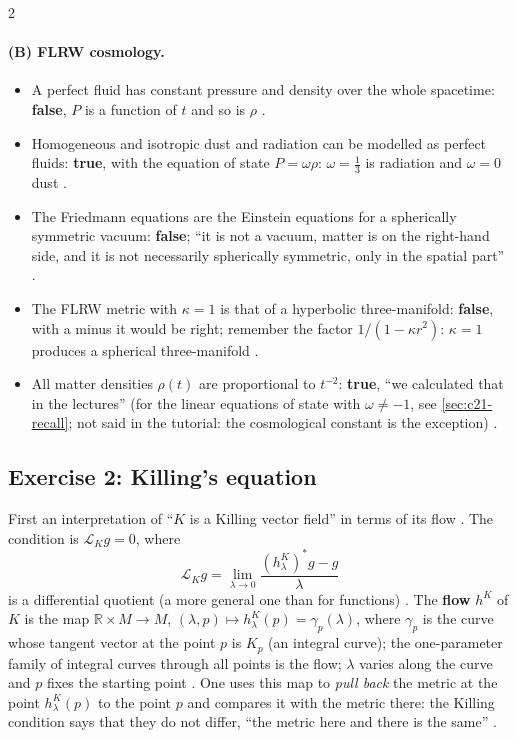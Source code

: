 \begin{paracol}{2}
\paragraph{(B) FLRW cosmology.}
\begin{itemize}
  \item A perfect fluid has constant pressure and density over the whole spacetime: \textbf{false}, $P$ is a function of $t$ and so is $\rho$ .
  \item Homogeneous and isotropic dust and radiation can be modelled as perfect fluids: \textbf{true}, with the equation of state $P=\omega\rho$: $\omega=\tfrac13$ is radiation and $\omega=0$ dust .
  \item The Friedmann equations are the Einstein equations for a spherically symmetric vacuum: \textbf{false}; ``it is not a vacuum, matter is on the right-hand side, and it is not necessarily spherically symmetric, only in the spatial part'' .
  \item The FLRW metric with $\kappa=1$ is that of a hyperbolic three-manifold: \textbf{false}, with a minus it would be right; remember the factor $1/(1-\kappa r^2)$: $\kappa=1$ produces a spherical three-manifold .
  \item All matter densities $\rho(t)$ are proportional to $t^{-2}$: \textbf{true}, ``we calculated that in the lectures'' (for the linear equations of state with $\omega\neq-1$, see \cref{sec:c21-recall}; not said in the tutorial: the cosmological constant is the exception) .
\end{itemize}

\subsection*{Exercise 2: Killing's equation}

First an interpretation of ``$K$ is a Killing vector field'' in terms of its flow . The condition is $\mathcal L_Kg=0$, where
\[
  \mathcal L_Kg=\lim_{\lambda\to0}\frac{(h^K_\lambda)^*g-g}{\lambda}
\]
is a differential quotient (a more general one than for functions) . The \textbf{flow} $h^K$ of $K$ is the map $\mathbb R\times M\to M$, $(\lambda,p)\mapsto h^K_\lambda(p)=\gamma_p(\lambda)$, where $\gamma_p$ is the curve whose tangent vector at the point $p$ is $K_p$ (an integral curve); the one-parameter family of integral curves through all points is the flow; $\lambda$ varies along the curve and $p$ fixes the starting point . One uses this map to \emph{pull back} the metric at the point $h^K_\lambda(p)$ to the point $p$ and compares it with the metric there: the Killing condition says that they do not differ, ``the metric here and there is the same'' .


\end{paracol}
